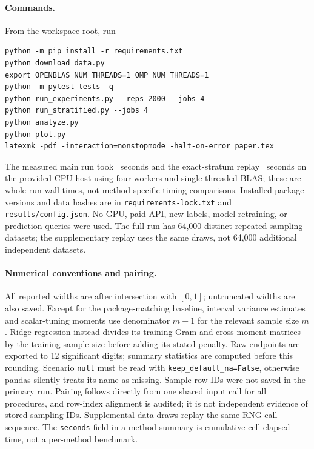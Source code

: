 \documentclass{article}
\begin{document}
\paragraph{Commands.}
From the workspace root, run
\begin{verbatim}
python -m pip install -r requirements.txt
python download_data.py
export OPENBLAS_NUM_THREADS=1 OMP_NUM_THREADS=1
python -m pytest tests -q
python run_experiments.py --reps 2000 --jobs 4
python run_stratified.py --jobs 4
python analyze.py
python plot.py
latexmk -pdf -interaction=nonstopmode -halt-on-error paper.tex
\end{verbatim}
The measured main run took \RunSeconds\ seconds and the exact-stratum replay \SupplementSeconds\ seconds on the provided CPU host using four workers and single-threaded BLAS; these are whole-run wall times, not method-specific timing comparisons. Installed package versions and data hashes are in \texttt{requirements-lock.txt} and \texttt{results/config.json}. No GPU, paid API, new labels, model retraining, or prediction queries were used. The full run has 64,000 distinct repeated-sampling datasets; the supplementary replay uses the same draws, not 64,000 additional independent datasets.

\paragraph{Numerical conventions and pairing.}
All reported widths are after intersection with $[0,1]$; untruncated widths are also saved. Except for the package-matching baseline, interval variance estimates and scalar-tuning moments use denominator $m-1$ for the relevant sample size $m$. Ridge regression instead divides its training Gram and cross-moment matrices by the training sample size before adding its stated penalty. Raw endpoints are exported to 12 significant digits; summary statistics are computed before this rounding. Scenario \texttt{null} must be read with \texttt{keep\_default\_na=False}, otherwise pandas silently treats its name as missing. Sample row IDs were not saved in the primary run. Pairing follows directly from one shared input call for all procedures, and row-index alignment is audited; it is not independent evidence of stored sampling IDs. Supplemental data draws replay the same RNG call sequence. The \texttt{seconds} field in a method summary is cumulative cell elapsed time, not a per-method benchmark.
\end{document}
